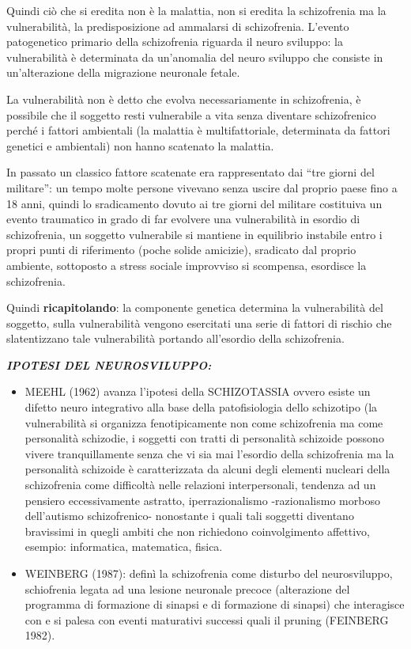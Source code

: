 \documentclass[]{article}
\begin{document}
Quindi ciò che si eredita non è la malattia, non si eredita la
schizofrenia ma la vulnerabilità, la predisposizione ad ammalarsi di
schizofrenia. L'evento patogenetico primario della schizofrenia riguarda
il neuro sviluppo: la vulnerabilità è determinata da un'anomalia del
neuro sviluppo che consiste in un'alterazione della migrazione neuronale
fetale.

La vulnerabilità non è detto che evolva necessariamente in schizofrenia,
è possibile che il soggetto resti vulnerabile a vita senza diventare
schizofrenico perché i fattori ambientali (la malattia è
multifattoriale, determinata da fattori genetici e ambientali) non hanno
scatenato la malattia.

In passato un classico fattore scatenate era rappresentato dai ``tre
giorni del militare'': un tempo molte persone vivevano senza uscire dal
proprio paese fino a 18 anni, quindi lo sradicamento dovuto ai tre
giorni del militare costituiva un evento traumatico in grado di far
evolvere una vulnerabilità in esordio di schizofrenia, un soggetto
vulnerabile si mantiene in equilibrio instabile entro i propri punti di
riferimento (poche solide amicizie), sradicato dal proprio ambiente,
sottoposto a stress sociale improvviso si scompensa, esordisce la
schizofrenia.

Quindi \textbf{ricapitolando}: la componente genetica determina la
vulnerabilità del soggetto, sulla vulnerabilità vengono esercitati una
serie di fattori di rischio che slatentizzano tale vulnerabilità
portando all'esordio della schizofrenia.

\textbf{\emph{IPOTESI DEL NEUROSVILUPPO:}}

\begin{itemize}
\item
  MEEHL (1962) avanza l'ipotesi della SCHIZOTASSIA ovvero esiste un
  difetto neuro integrativo alla base della patofisiologia dello
  schizotipo (la vulnerabilità si organizza fenotipicamente non come
  schizofrenia ma come personalità schizodie, i soggetti con tratti di
  personalità schizoide possono vivere tranquillamente senza che vi sia
  mai l'esordio della schizofrenia ma la personalità schizoide è
  caratterizzata da alcuni degli elementi nucleari della schizofrenia
  come difficoltà nelle relazioni interpersonali, tendenza ad un
  pensiero eccessivamente astratto, iperrazionalismo -razionalismo
  morboso dell'autismo schizofrenico- nonostante i quali tali soggetti
  diventano bravissimi in quegli ambiti che non richiedono
  coinvolgimento affettivo, esempio: informatica, matematica, fisica.
\item
  WEINBERG (1987): definì la schizofrenia come disturbo del
  neurosviluppo, schiofrenia legata ad una lesione neuronale precoce
  (alterazione del programma di formazione di sinapsi e di formazione di
  sinapsi) che interagisce con e si palesa con eventi maturativi
  successi quali il pruning (FEINBERG 1982).
\end{itemize}
\end{document}
